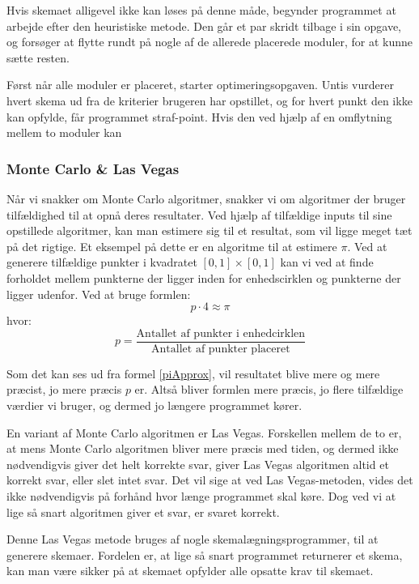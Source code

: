 Hvis skemaet alligevel ikke kan løses på denne måde, begynder programmet at arbejde efter den heuristiske metode. Den går et par skridt tilbage i sin opgave, og forsøger at flytte rundt på nogle af de allerede placerede moduler, for at kunne sætte resten.

Først når alle moduler er placeret, starter optimeringsopgaven. Untis vurderer hvert skema ud fra de kriterier brugeren har opstillet, og for hvert punkt den ikke kan opfylde, får programmet straf-point. Hvis den ved hjælp af en omflytning mellem to moduler kan 

\subsubsection{Monte Carlo \& Las Vegas}
Når vi snakker om Monte Carlo algoritmer, snakker vi om algoritmer der bruger tilfældighed til at opnå deres resultater\cite{mcbook}. Ved hjælp af tilfældige inputs til sine opstillede algoritmer, kan man estimere sig til et resultat, som vil ligge meget tæt på det rigtige. Et eksempel på dette er en algoritme til at estimere $\pi$\cite{MontePi}. Ved at generere tilfældige punkter i kvadratet $[0,1] \times [0,1]$ kan vi ved at finde forholdet mellem punkterne der ligger inden for enhedscirklen og punkterne der ligger udenfor. Ved at bruge formlen:
\begin{equation}
	\label{piApprox}
	p \cdot 4 \approx \pi
\end{equation}
hvor:
$$p = \frac{\text{Antallet af punkter i enhedcirklen}}{\text{Antallet af punkter placeret}}$$

Som det kan ses ud fra formel \ref{piApprox}, vil resultatet blive mere og mere præcist, jo mere præcis $p$ er. Altså bliver formlen mere præcis, jo flere tilfældige værdier vi bruger, og dermed jo længere programmet kører.

En variant af Monte Carlo algoritmen er Las Vegas. Forskellen mellem de to er, at mens Monte Carlo algoritmen bliver mere præcis med tiden, og dermed ikke nødvendigvis giver det helt korrekte svar, giver Las Vegas algoritmen altid et korrekt svar, eller slet intet svar. Det vil sige at ved Las Vegas-metoden, vides det ikke nødvendigvis på forhånd hvor længe programmet skal køre. Dog ved vi at lige så snart algoritmen giver et svar, er svaret korrekt.

Denne Las Vegas metode bruges af nogle skemalægningsprogrammer, til at generere skemaer. Fordelen er, at lige så snart programmet returnerer et skema, kan man være sikker på at skemaet opfylder alle opsatte krav til skemaet.